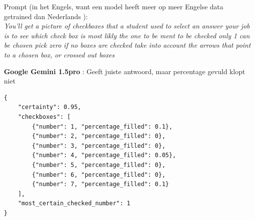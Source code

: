 \documentclass[12pt]{article}
\begin{document}
\begin{multicols}{2}
\noindent Prompt (in het Engels, want een model heeft meer op meer Engelse data getrained dan Nederlands ):\\
\textit{You'll get a picture of checkboxes that a student used to select an answer
    your job is to see which check box is most likly the one to be ment to be checked
    only 1 can be chosen
    pick zero if no boxes are checked 
    take into account the arrows that point to a chosen box, or crossed out boxes}


\end{multicols}
\pagebreak

\textbf{Google Gemini 1.5pro} : Geeft juiste antwoord, maar percentage gevuld klopt niet
\begin{listing}[H]
    
    \begin{verbatim}
{
    "certainty": 0.95, 
    "checkboxes": [
        {"number": 1, "percentage_filled": 0.1}, 
        {"number": 2, "percentage_filled": 0}, 
        {"number": 3, "percentage_filled": 0}, 
        {"number": 4, "percentage_filled": 0.05}, 
        {"number": 5, "percentage_filled": 0}, 
        {"number": 6, "percentage_filled": 0}, 
        {"number": 7, "percentage_filled": 0.1}
    ], 
    "most_certain_checked_number": 1
}
        \end{verbatim}
\end{listing}
\pagebreak
\end{document}
